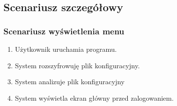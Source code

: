 \documentclass[a4paper]{article}
\begin{document}
\subsection{Scenariusz szczegółowy}

\subsubsection{Scenariusz wyświetlenia menu} \label{wMenu}
\begin{enumerate}
    \item Użytkownik uruchamia programu.
    \item System rozszyfrowuję plik konfiguracyjny.
    \item System analizuje plik konfiguracyjny
    \item System wyświetla ekran główny przed zalogowaniem.
\end{enumerate}
\end{document}
